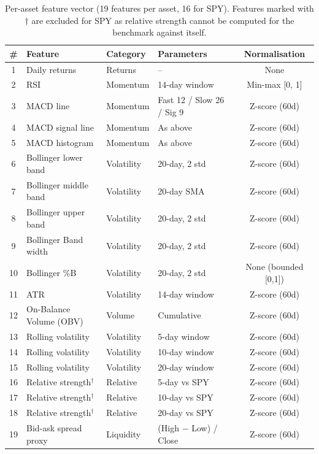 \documentclass[11pt,a4paper]{article}
\begin{document}
\begin{table}[H]
\centering
\small
\caption{Per-asset feature vector (19 features per asset, 16 for SPY). Features marked with $\dagger$ are excluded for SPY as relative strength cannot be computed for the benchmark against itself.}
\label{tab:features}
\begin{tabular}{@{}clllc@{}}
\toprule
\textbf{\#} & \textbf{Feature} & \textbf{Category} & \textbf{Parameters} & \textbf{Normalisation} \\
\midrule
1  & Daily returns           & Returns       & --                        & None \\
2  & RSI                     & Momentum      & 14-day window             & Min-max [0, 1] \\
3  & MACD line               & Momentum      & Fast 12 / Slow 26 / Sig 9 & Z-score (60d) \\
4  & MACD signal line        & Momentum      & As above                  & Z-score (60d) \\
5  & MACD histogram          & Momentum      & As above                  & Z-score (60d) \\
6  & Bollinger lower band    & Volatility    & 20-day, 2 std             & Z-score (60d) \\
7  & Bollinger middle band   & Volatility    & 20-day SMA                & Z-score (60d) \\
8  & Bollinger upper band    & Volatility    & 20-day, 2 std             & Z-score (60d) \\
9  & Bollinger Band width    & Volatility    & 20-day, 2 std             & Z-score (60d) \\
10 & Bollinger \%B           & Volatility    & 20-day, 2 std             & None (bounded [0,1]) \\
11 & ATR                     & Volatility    & 14-day window             & Z-score (60d) \\
12 & On-Balance Volume (OBV) & Volume        & Cumulative                & Z-score (60d) \\
13 & Rolling volatility      & Volatility    & 5-day window              & Z-score (60d) \\
14 & Rolling volatility      & Volatility    & 10-day window             & Z-score (60d) \\
15 & Rolling volatility      & Volatility    & 20-day window             & Z-score (60d) \\
16 & Relative strength$^\dagger$ & Relative  & 5-day vs SPY              & Z-score (60d) \\
17 & Relative strength$^\dagger$ & Relative  & 10-day vs SPY             & Z-score (60d) \\
18 & Relative strength$^\dagger$ & Relative  & 20-day vs SPY             & Z-score (60d) \\
19 & Bid-ask spread proxy    & Liquidity     & (High $-$ Low) / Close    & Z-score (60d) \\
\bottomrule
\end{tabular}
\end{table}
\end{document}

